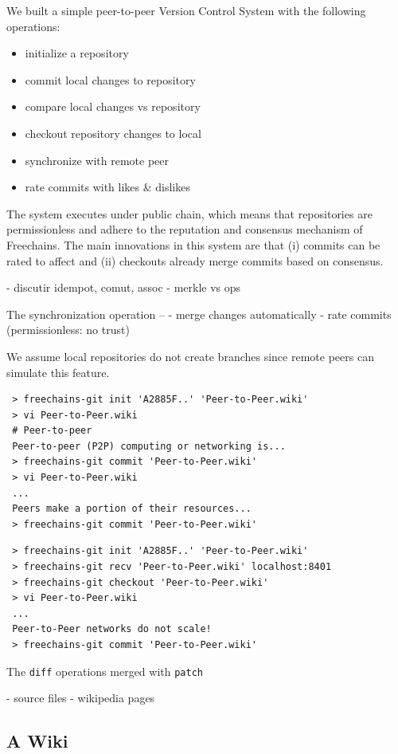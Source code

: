 \documentclass[10pt,journal,compsoc]{IEEEtran}
\newcommand{\FC}       {Freechains\xspace}
\begin{document}
We built a simple peer-to-peer Version Control System with the following
operations:
%
\begin{itemize}
    \item initialize a repository
    \item commit local changes to repository
    \item compare local changes vs repository
    \item checkout repository changes to local
    \item synchronize with remote peer
    \item rate commits with likes \& dislikes
\end{itemize}
%
The system executes under public chain, which means that repositories are
permissionless and adhere to the reputation and consensus mechanism of \FC.
The main innovations in this system are that (i) commits can be rated to affect
and (ii) checkouts already merge commits based on consensus.

- discutir idempot, comut, assoc
    - merkle vs ops

The synchronization operation
--
    - merge changes automatically
    - rate commits (permissionless: no trust)


We assume local repositories do not create branches since remote peers can
simulate this feature.

{\footnotesize
\begin{verbatim}
 > freechains-git init 'A2885F..' 'Peer-to-Peer.wiki'
 > vi Peer-to-Peer.wiki
 # Peer-to-peer
 Peer-to-peer (P2P) computing or networking is...
 > freechains-git commit 'Peer-to-Peer.wiki'
 > vi Peer-to-Peer.wiki
 ...
 Peers make a portion of their resources...
 > freechains-git commit 'Peer-to-Peer.wiki'
\end{verbatim}
}

{\footnotesize
\begin{verbatim}
 > freechains-git init 'A2885F..' 'Peer-to-Peer.wiki'
 > freechains-git recv 'Peer-to-Peer.wiki' localhost:8401
 > freechains-git checkout 'Peer-to-Peer.wiki'
 > vi Peer-to-Peer.wiki
 ...
 Peer-to-Peer networks do not scale!
 > freechains-git commit 'Peer-to-Peer.wiki'
\end{verbatim}
}

The 
\texttt{diff} operations merged with \texttt{patch}

- source files
- wikipedia pages

\subsection{A Wiki}
\end{document}
